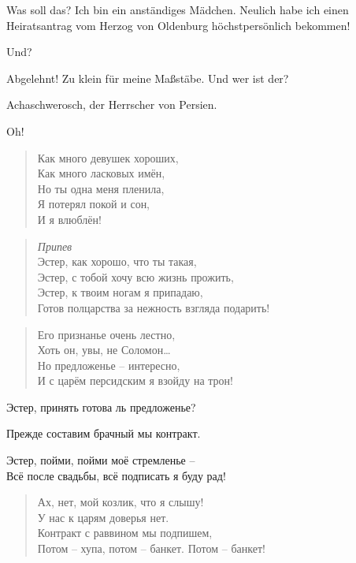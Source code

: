 \documentclass[12pt,a4paper,titlepage]{article}
\begin{document}
\begin{drama}
\espeaks
Was soll das? Ich bin ein anständiges Mädchen. Neulich habe ich
einen Heiratsantrag vom Herzog von Oldenburg höchstpersönlich bekommen!

\uespeaks
Und?

\espeaks
Abgelehnt! Zu klein für meine Maßstäbe. Und wer ist der?

\uespeaks
Achaschwerosch, der Herrscher von Persien.

\espeaks
Oh!

\ahspeaks {}
\begin{verse}
Как много девушек хороших,\\
Как много ласковых имён,\\
Но ты одна меня пленила,\\
Я потерял покой и сон,\\
И я влюблён!\\
\end{verse}

\begin{verse}
\textit{Припев}\\
Эстер, как хорошо, что ты такая,\\
Эстер, с тобой хочу всю жизнь прожить,\\
Эстер, к твоим ногам я припадаю,\\
Готов полцарства за нежность взгляда подарить!\\
\end{verse}

\espeaks {}
\begin{verse}
Его признанье очень лестно,\\
Хоть он, увы, не Соломон\ldots\\
Но предложенье -- интересно,\\
И с царём персидским я взойду на трон!\\
\end{verse}


Эстер, принять готова ль предложенье?

Прежде составим брачный мы контракт.

Эстер, пойми, пойми моё стремленье --\\
Всё после свадьбы, всё подписать я буду рад!

 
\begin{verse}
Ах, нет, мой козлик, что я слышу!\\
У нас к царям доверья нет.\\
Контракт с раввином мы подпишем,\\
Потом -- хупа, потом -- банкет. Потом -- банкет!\\
\end{verse}


\end{drama}
\end{document}
